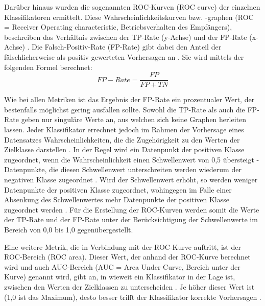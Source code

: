 \label{roc-def}
Darüber hinaus wurden die sogenannten ROC-Kurven (ROC curve) der einzelnen Klassifikatoren ermittelt. Diese Wahrscheinlichkeitskurven bzw. -graphen (ROC = Receiver Operating characteristic, Betriebsverhalten des Empfängers), beschreiben das Verhältnis zwischen der TP-Rate (y-Achse) und der FP-Rate (x-Achse) \cite{Sammut2017,Narkhede2018}. Die Falsch-Positiv-Rate (FP-Rate) gibt dabei den Anteil der fälschlicherweise als positiv gewerteten Vorhersagen an \cite{Alpaydin2010}. Sie wird mittels der folgenden Formel berechnet:
\\\[FP-Rate = \frac{FP}{FP+TN}\]

Wie bei allen Metriken ist das Ergebnis der FP-Rate ein prozentualer Wert, der bestenfalls möglichst gering ausfallen sollte. Sowohl die TP-Rate als auch die FP-Rate geben nur singuläre Werte an, aus welchen sich keine Graphen herleiten lassen. Jeder Klassifikator errechnet jedoch im Rahmen der Vorhersage eines Datensatzes Wahrscheinlichkeiten, die die Zugehörigkeit zu den Werten der Zielklasse darstellen \cite{KNIMETV2019}. In der Regel wird ein Datenpunkt der positiven Klasse zugeordnet, wenn die Wahrscheinlichkeit einen Schwellenwert von 0,5 übersteigt - Datenpunkte, die diesen Schwellenwert unterschreiten werden wiederum der negativen Klasse zugeordnet \cite{KNIMETV2019}. Wird der Schwellenwert erhöht, so werden weniger Datenpunkte der positiven Klasse zugeordnet, wohingegen im Falle einer Absenkung des Schwellenwertes mehr Datenpunkte der positiven Klasse zugeordnet werden \cite{KNIMETV2019}. Für die Erstellung der ROC-Kurven werden somit die Werte der TP-Rate und der FP-Rate unter der Berücksichtigung der Schwellenwerte im Bereich von 0,0 bis 1,0 gegenübergestellt.

Eine weitere Metrik, die in Verbindung mit der ROC-Kurve auftritt, ist der ROC-Bereich (ROC area). Dieser Wert, der anhand der ROC-Kurve berechnet wird und auch AUC-Bereich (AUC = Area Under Curve, Bereich unter der Kurve) genannt wird, gibt an, in wieweit ein Klassifikator in der Lage ist, zwischen den Werten der Zielklassen zu unterscheiden \cite{Narkhede2018}. Je höher dieser Wert ist (1,0 ist das Maximum), desto besser trifft der Klassifikator korrekte Vorhersagen \cite{Narkhede2018}.

